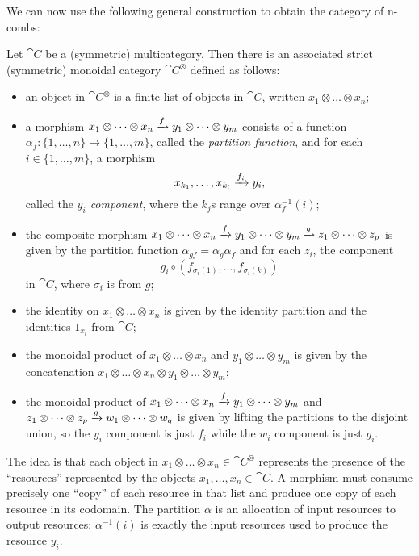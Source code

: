 We can now use the following general construction to obtain the category of
n-combs:

\begin{dfn}\label{def:associated-monoidal-category}
  Let $\cat{C}$ be a (symmetric) multicategory. Then there is an associated
  strict (symmetric) monoidal category $\cat{C}^\otimes$ defined as follows:
  \begin{itemize}
    \item an object in $\cat{C}^\otimes$ is a finite list of objects in
      $\cat{C}$, written $x_1\otimes\dots\otimes x_n$;
    \item a morphism $x_1\otimes\dots\otimes x_n\xrightarrow{f} y_1\otimes \dots\otimes
      y_m$ consists of a function
      $\alpha_f: \{1,\dots,n\}\to\{1,\dots,m\}$, called the \emph{partition
      function}, and for each $i\in\{1,\dots,m\}$, a morphism \[
        x_{k_1}, \dots, x_{k_l}\xrightarrow{f_i} y_i,
      \] called the \emph{$y_i$ component}, where the $k_j$s range over
      $\alpha_f^{-1}(i)$;
    \item the composite morphism $x_1\otimes\dots\otimes
      x_n\xrightarrow{f}y_1\otimes\dots\otimes y_m\xrightarrow{g}z_1\otimes\dots\otimes z_p$ is
      given by the partition function $\alpha_{gf} = \alpha_g\alpha_f$ and for
      each $z_i$, the component \[
        g_i\circ(f_{\sigma_i(1)},\dots,f_{\sigma_i(k)})
      \]in $\cat{C}$, where $\sigma_i$ is from $g$;
    \item the identity on $x_1\otimes\dots\otimes x_n$ is given by the identity
      partition and the identities $1_{x_i}$ from $\cat{C}$;
    \item the monoidal product of $x_1\otimes\dots\otimes x_n$ and
      $y_1\otimes\dots\otimes y_m$ is given by the concatenation
      $x_1\otimes\dots\otimes x_n\otimes y_1\otimes \dots\otimes y_m$;
    \item the monoidal product of $x_1\otimes\dots\otimes x_n\xrightarrow{f} y_1\otimes\dots\otimes y_m$
      and $z_1\otimes\dots\otimes z_p\xrightarrow{g} w_1\otimes\dots\otimes w_q$ is given
      by lifting the partitions to the disjoint union, so the $y_i$
      component is just $f_i$ while the $w_i$ component is just $g_i$.
  \end{itemize}
\end{dfn}

The idea is that each object in $x_1\otimes\dots\otimes x_n\in\cat{C}^\otimes$
represents the presence of the ``resources'' represented by the objects
$x_1,\dots,x_n\in\cat{C}$. A morphism must consume precisely one ``copy'' of
each resource in that list and produce one copy of each resource in its
codomain. The partition $\alpha$ is an allocation of input resources to output
resources: $\alpha^{-1}(i)$ is exactly the input resources used to produce the
resource $y_i$.

